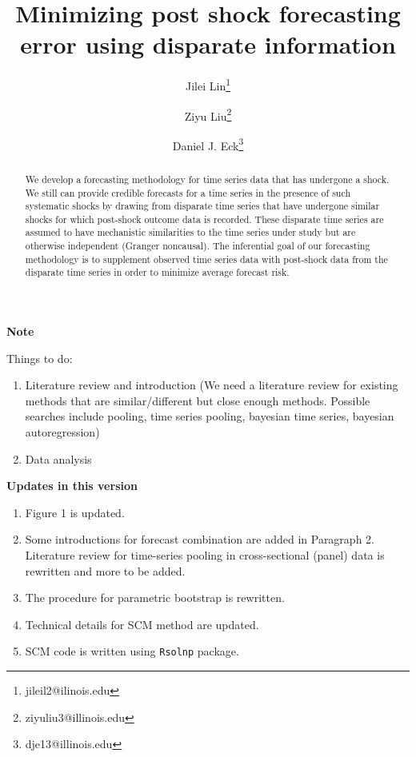 \documentclass[11pt]{article}
\title{Minimizing post shock forecasting error using disparate information}
\author{Jilei Lin\thanks{jileil2@ilinois.edu}}
\author{Ziyu Liu\thanks{ziyuliu3@illinois.edu}}
\author{Daniel J. Eck\thanks{dje13@illinois.edu}}
\affil{Department of Statistics, University of Illinois at Urbana-Champaign}
\theoremstyle{definition}
\begin{document}
\begin{center}
  \textbf{Note}
\end{center}


Things to do:
\begin{enumerate}
  \item Literature review and introduction (We need a literature review for existing methods that are similar/different but close enough methods.  Possible searches include pooling, time series pooling, bayesian time series, bayesian autoregression)
  \item Data analysis
\end{enumerate}


\begin{center}
  \textbf{Updates in this version}
\end{center}

\begin{enumerate}
  \item Figure 1 is updated.
  \item Some introductions for forecast combination are added in Paragraph 2. Literature review for time-series pooling in cross-sectional (panel) data is rewritten and more to be added.
  \item The procedure for parametric bootstrap is rewritten.
  \item Technical details for SCM method are updated.
  \item SCM code is written using \texttt{Rsolnp} package.
\end{enumerate}


\tableofcontents


\newpage 

\maketitle
\begin{abstract}
    We develop a forecasting methodology for time series data that has 
    undergone a shock. We still can provide credible forecasts for a time 
    series in the presence of such systematic shocks by drawing from disparate 
    time series that have undergone similar shocks for which post-shock 
    outcome data is recorded.  These disparate time series are assumed to have 
    mechanistic similarities to the time series under study but are otherwise 
    independent (Granger noncausal).  The inferential goal of our forecasting 
    methodology is to supplement observed time series data with post-shock 
    data from the disparate time series in order to minimize average forecast 
    risk. 
\end{abstract}
\end{document}

